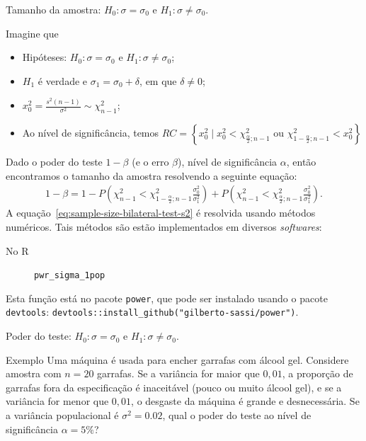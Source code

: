 \documentclass[8pt]{beamer}
\begin{document}
\begin{frame}{Tamanho da amostra: $H_0: \sigma = \sigma_0$ e $H_1: \sigma \neq \sigma_0$.}

Imagine que
\begin{itemize}
	\item Hipóteses: $H_0: \sigma=\sigma_0$ e $H_1: \sigma \neq \sigma_0$;
	\item $H_1$ é verdade e $\sigma_1 = \sigma_0 + \delta$, em que $\delta \neq 0$;
	\item $x_0^2 = \frac{s^2(n-1)}{\sigma^2} \sim \chi_{n-1}^2$;
	\item Ao nível de significância, temos $RC=\left\{ x_0^2 \mid x_0^2 < \chi_{\frac{\alpha}{2};n-1}^2 \mbox{ ou } \chi_{1-\frac{\alpha}{2};n-1}^2 < x_0^2  \right\}$
\end{itemize}
\vfill

Dado o poder do teste $1-\beta$ (e o erro $\beta$), nível de significância $\alpha$, então encontramos o tamanho da amostra resolvendo a seguinte equação:
\begin{align}\label{eq:sample-size-bilateral-test-s2}
	1-\beta = 1- P \left( \chi_{n-1}^2 < \chi_{1-\frac{\alpha}{2};n-1}^2 \frac{\sigma_0^2}{\sigma_1^2} \right) + P \left( \chi_{n-1}^2 < \chi_{\frac{\alpha}{2};n-1}^2 \frac{\sigma_0^2}{\sigma_1^2} \right).
\end{align}
A equação~\eqref{eq:sample-size-bilateral-test-s2} é resolvida usando métodos numéricos. Tais métodos são estão implementados em diversos \textit{softwares}:
\begin{description}
	\item[No R] \lstinline|pwr_sigma_1pop|
\end{description}

Esta função está no pacote \lstinline|power|, que pode ser instalado usando o pacote \lstinline|devtools|: \lstinline|devtools::install_github("gilberto-sassi/power")|.
\end{frame}

\begin{frame}{Poder do teste: $H_0: \sigma = \sigma_0$ e $H_1: \sigma \neq \sigma_0$.}

\large

\begin{block}{Exemplo}
	Uma máquina é usada para encher garrafas com álcool gel. Considere amostra com $n=20$ garrafas. Se a variância for maior que $0,01$, a proporção de garrafas fora da especificação é inaceitável (pouco ou muito álcool gel), e se a variância for menor que $0,01$, o desgaste da máquina é grande e desnecessária. Se a variância populacional é $\sigma^2=0.02$, qual o poder do teste ao nível de significância $\alpha=5\%$?
\end{block}

\normalsize
\end{frame}
\end{document}
